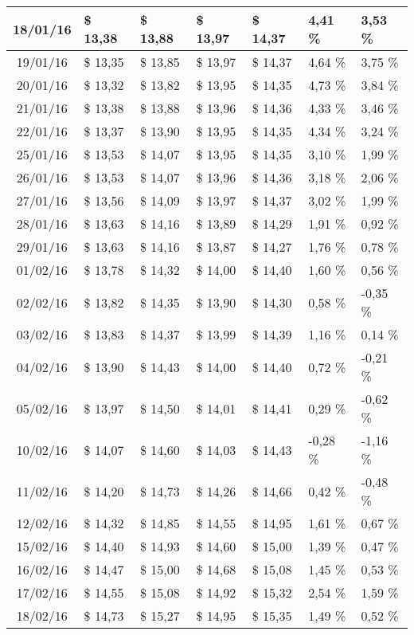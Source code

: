 \begin{center}
\begin{longtable}{|c|p{1.5cm}|p{1.5cm}|p{1.5cm}|p{1.5cm}|p{1.5cm}|p{1.5cm}|}
18/01/16 & \$ 13,38 & \$ 13,88 & \$ 13,97 & \$ 14,37 & 4,41 \% & 3,53 \% \\ \hline
19/01/16 & \$ 13,35 & \$ 13,85 & \$ 13,97 & \$ 14,37 & 4,64 \% & 3,75 \% \\ \hline
20/01/16 & \$ 13,32 & \$ 13,82 & \$ 13,95 & \$ 14,35 & 4,73 \% & 3,84 \% \\ \hline
21/01/16 & \$ 13,38 & \$ 13,88 & \$ 13,96 & \$ 14,36 & 4,33 \% & 3,46 \% \\ \hline
22/01/16 & \$ 13,37 & \$ 13,90 & \$ 13,95 & \$ 14,35 & 4,34 \% & 3,24 \% \\ \hline
25/01/16 & \$ 13,53 & \$ 14,07 & \$ 13,95 & \$ 14,35 & 3,10 \% & 1,99 \% \\ \hline
26/01/16 & \$ 13,53 & \$ 14,07 & \$ 13,96 & \$ 14,36 & 3,18 \% & 2,06 \% \\ \hline
27/01/16 & \$ 13,56 & \$ 14,09 & \$ 13,97 & \$ 14,37 & 3,02 \% & 1,99 \% \\ \hline
28/01/16 & \$ 13,63 & \$ 14,16 & \$ 13,89 & \$ 14,29 & 1,91 \% & 0,92 \% \\ \hline
29/01/16 & \$ 13,63 & \$ 14,16 & \$ 13,87 & \$ 14,27 & 1,76 \% & 0,78 \% \\ \hline
01/02/16 & \$ 13,78 & \$ 14,32 & \$ 14,00 & \$ 14,40 & 1,60 \% & 0,56 \% \\ \hline
02/02/16 & \$ 13,82 & \$ 14,35 & \$ 13,90 & \$ 14,30 & 0,58 \% & -0,35 \% \\ \hline
03/02/16 & \$ 13,83 & \$ 14,37 & \$ 13,99 & \$ 14,39 & 1,16 \% & 0,14 \% \\ \hline
04/02/16 & \$ 13,90 & \$ 14,43 & \$ 14,00 & \$ 14,40 & 0,72 \% & -0,21 \% \\ \hline
05/02/16 & \$ 13,97 & \$ 14,50 & \$ 14,01 & \$ 14,41 & 0,29 \% & -0,62 \% \\ \hline
10/02/16 & \$ 14,07 & \$ 14,60 & \$ 14,03 & \$ 14,43 & -0,28 \% & -1,16 \% \\ \hline
11/02/16 & \$ 14,20 & \$ 14,73 & \$ 14,26 & \$ 14,66 & 0,42 \% & -0,48 \% \\ \hline
12/02/16 & \$ 14,32 & \$ 14,85 & \$ 14,55 & \$ 14,95 & 1,61 \% & 0,67 \% \\ \hline
15/02/16 & \$ 14,40 & \$ 14,93 & \$ 14,60 & \$ 15,00 & 1,39 \% & 0,47 \% \\ \hline
16/02/16 & \$ 14,47 & \$ 15,00 & \$ 14,68 & \$ 15,08 & 1,45 \% & 0,53 \% \\ \hline
17/02/16 & \$ 14,55 & \$ 15,08 & \$ 14,92 & \$ 15,32 & 2,54 \% & 1,59 \% \\ \hline
18/02/16 & \$ 14,73 & \$ 15,27 & \$ 14,95 & \$ 15,35 & 1,49 \% & 0,52 \% \\ \hline

\end{longtable}
\end{center}

